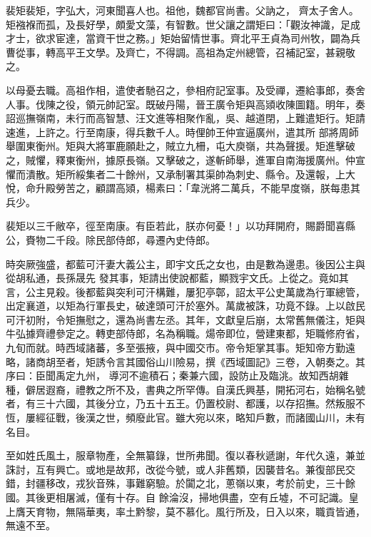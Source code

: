 \begin{pinyinscope}
 裴矩裴矩，字弘大，河東聞喜人也。祖他，魏都官尚書。父訥之，
 齊太子舍人。矩襁褓而孤，及長好學，頗愛文藻，有智數。世父讓之謂矩曰：「觀汝神識，足成才士，欲求宦達，當資干世之務。」矩始留情世事。齊北平王貞為司州牧，闢為兵曹從事，轉高平王文學。及齊亡，不得調。高祖為定州總管，召補記室，甚親敬之。



 以母憂去職。高祖作相，遣使者馳召之，參相府記室事。及受禪，遷給事郎，奏舍人事。伐陳之役，領元帥記室。既破丹陽，晉王廣令矩與高熲收陳圖籍。明年，奏詔巡撫嶺南，未行而高智慧、汪文進等相聚作亂，吳、越道閉，上難遣矩行。矩請速進，上許之。行至南康，得兵數千人。時俚帥王仲宣逼廣州，遣其所
 部將周師舉圍東衡州。矩與大將軍鹿願赴之，賊立九柵，屯大庾嶺，共為聲援。矩進擊破之，賊懼，釋東衡州，據原長嶺。又擊破之，遂斬師舉，進軍自南海援廣州。仲宣懼而潰散。矩所綏集者二十餘州，又承制署其渠帥為刺史、縣令。及還報，上大悅，命升殿勞苦之，顧謂高熲，楊素曰：「韋洸將二萬兵，不能早度嶺，朕每患其兵少。



 裴矩以三千敝卒，徑至南康。有臣若此，朕亦何憂！」以功拜開府，賜爵聞喜縣公，賚物二千段。除民部侍郎，尋遷內史侍郎。



 時突厥強盛，都藍可汗妻大義公主，即宇文氏之女也，由是數為邊患。後因公主與從胡私通，長孫晟先
 發其事，矩請出使說都藍，顯戮宇文氏。上從之。竟如其言，公主見殺。後都藍與突利可汗構難，屢犯亭鄣，詔太平公史萬歲為行軍總管，出定襄道，以矩為行軍長史，破達頭可汗於塞外。萬歲被誅，功竟不錄。上以啟民可汗初附，令矩撫慰之，還為尚書左丞。其年，文獻皇后崩，太常舊無儀注，矩與牛弘據齊禮參定之。轉吏部侍郎，名為稱職。煬帝即位，營建東都，矩職修府省，九旬而就。時西域諸蕃，多至張掖，與中國交市。帝令矩掌其事。矩知帝方勤遠略，諸商胡至者，矩誘令言其國俗山川險易，撰《西域圖記》三卷，入朝奏之。其序曰：臣聞禹定九州，
 導河不逾積石；秦兼六國，設防止及臨洮。故知西胡雜種，僻居遐裔，禮教之所不及，書典之所罕傳。自漢氏興基，開拓河右，始稱名號者，有三十六國，其後分立，乃五十五王。仍置校尉、都護，以存招撫。然叛服不恆，屢經征戰，後漢之世，頻廢此官。雖大宛以來，略知戶數，而諸國山川，未有名目。



 至如姓氏風土，服章物產，全無纂錄，世所弗聞。復以春秋遞謝，年代久遠，兼並誅討，互有興亡。或地是故邦，改從今號，或人非舊類，因襲昔名。兼復部民交錯，封疆移改，戎狄音殊，事難窮驗。於闐之北，蔥嶺以東，考於前史，三十餘國。其後更相屠滅，僅有十存。自
 餘淪沒，掃地俱盡，空有丘墟，不可記識。皇上膺天育物，無隔華夷，率土黔黎，莫不慕化。風行所及，日入以來，職貢皆通，無遠不至。




\end{pinyinscope}
